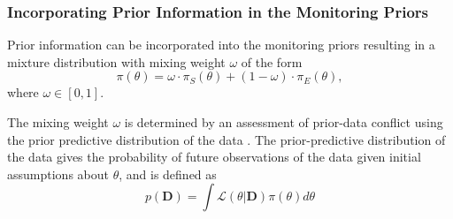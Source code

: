\documentclass[useAMS,usenatbib,referee]{biom}
\begin{document}


\subsubsection{Incorporating Prior Information in the Monitoring Priors}\label{sec:incorporating}
Prior information can be incorporated into the monitoring priors resulting in a mixture distribution with mixing weight $\omega$ of the form
\begin{equation}\label{eq:inference_prior}
\pi\left(\theta\right)=\omega\cdot\pi_{S}\left(\theta\right)+(1-\omega) \cdot \pi_E\left(\theta\right),
\end{equation}
where $\omega\in[0,1]$. 

The mixing weight $\omega$ is determined by an assessment of prior-data conflict using the prior predictive distribution of the data \citep{Box1980}.
The prior-predictive distribution of the data gives the probability of future observations of the data given initial assumptions about $\theta$, and is defined as
\begin{equation}\label{eq:pred_dist}
p(\mathbf{D})=\int \mathcal{L}(\theta|\mathbf{D})\pi(\theta)d\theta
\end{equation}
\end{document}

